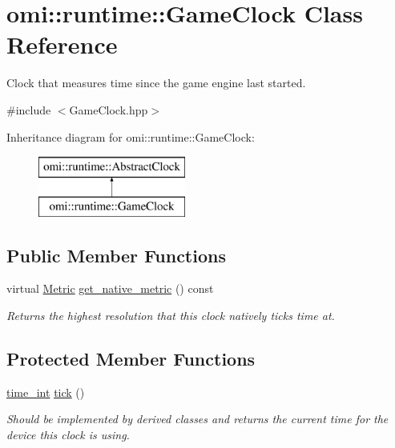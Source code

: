\hypertarget{classomi_1_1runtime_1_1_game_clock}{}\section{omi\+:\+:runtime\+:\+:Game\+Clock Class Reference}
\label{classomi_1_1runtime_1_1_game_clock}


Clock that measures time since the game engine last started.  




{\ttfamily \#include $<$Game\+Clock.\+hpp$>$}

Inheritance diagram for omi\+:\+:runtime\+:\+:Game\+Clock\+:\begin{figure}[H]
\begin{center}
\leavevmode
\includegraphics[height=2.000000cm]{classomi_1_1runtime_1_1_game_clock}
\end{center}
\end{figure}
\subsection*{Public Member Functions}
\begin{DoxyCompactItemize}
\item 
\hypertarget{classomi_1_1runtime_1_1_game_clock_a656c46b8609b36aa109be61413a978c8}{}virtual \hyperlink{classomi_1_1runtime_1_1_abstract_clock_a6af6e30a02165469ffcdcbd512d47a1b}{Metric} \hyperlink{classomi_1_1runtime_1_1_game_clock_a656c46b8609b36aa109be61413a978c8}{get\+\_\+native\+\_\+metric} () const \label{classomi_1_1runtime_1_1_game_clock_a656c46b8609b36aa109be61413a978c8}

\begin{DoxyCompactList}\small\item\em Returns the highest resolution that this clock natively ticks time at. \end{DoxyCompactList}\end{DoxyCompactItemize}
\subsection*{Protected Member Functions}
\begin{DoxyCompactItemize}
\item 
\hyperlink{classomi_1_1runtime_1_1_abstract_clock_af2122541388aea885afc08e8135340f7}{time\+\_\+int} \hyperlink{classomi_1_1runtime_1_1_game_clock_a8c0942d48db3f207b0de2a7ff77bd52e}{tick} ()
\begin{DoxyCompactList}\small\item\em Should be implemented by derived classes and returns the current time for the device this clock is using. \end{DoxyCompactList}\end{DoxyCompactItemize}
